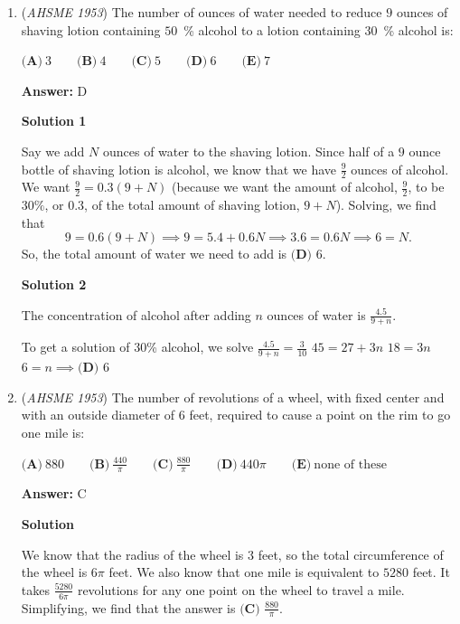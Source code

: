 \begin{enumerate}
 


	\item (\textit{AHSME 1953}) The number of ounces of water needed to reduce $9$ ounces of shaving lotion containing $50$ \% alcohol to a lotion containing $30$ \% alcohol is: 


 $\textbf{(A)}\ 3 \qquad \textbf{(B)}\ 4 \qquad \textbf{(C)}\ 5 \qquad \textbf{(D)}\ 6 \qquad \textbf{(E)}\ 7$

 \textbf{Answer: }D



\textbf{Solution 1}

Say we add $N$ ounces of water to the shaving lotion. Since half of a $9$ ounce bottle of shaving lotion is alcohol, we know that we have $\frac{9}{2}$ ounces of alcohol. We want $\frac{9}{2}=0.3(9+N)$ (because we want the amount of alcohol, $\frac{9}{2}$, to be $30\%$, or $0.3$, of the total amount of shaving lotion, $9+N$). Solving, we find that 
 \[9=0.6(9+N)\implies9=5.4+0.6N\implies3.6=0.6N\implies6=N.\] So, the total amount of water we need to add is $\boxed{\textbf{(D) } 6}$.

 



\textbf{Solution 2}

The concentration of alcohol after adding $n$ ounces of water is $\frac{4.5}{9+n}$. 

 To get a solution of 30\% alcohol, we solve $\frac{4.5}{9+n}=\frac{3}{10}$
$45=27+3n$
$18=3n$
$6=n \implies \boxed{\textbf{(D) } 6}$



	\item (\textit{AHSME 1953}) The number of revolutions of a wheel, with fixed center and with an outside diameter of $6$ feet, required to cause a point on the rim to go one mile is: 


 $\textbf{(A)}\ 880 \qquad \textbf{(B)}\ \frac{440}{\pi} \qquad \textbf{(C)}\ \frac{880}{\pi} \qquad \textbf{(D)}\ 440\pi\qquad \textbf{(E)}\ \text{none of these}$

 \textbf{Answer: }C



\textbf{Solution}

We know that the radius of the wheel is $3$ feet, so the total circumference of the wheel is $6\pi$ feet. We also know that one mile is equivalent to $5280$ feet. It takes $\frac{5280}{6\pi}$ revolutions for any one point on the wheel to travel a mile. Simplifying, we find that the answer is $\boxed{\textbf{(C) } \frac{880}{\pi}}$.


\end{enumerate}
